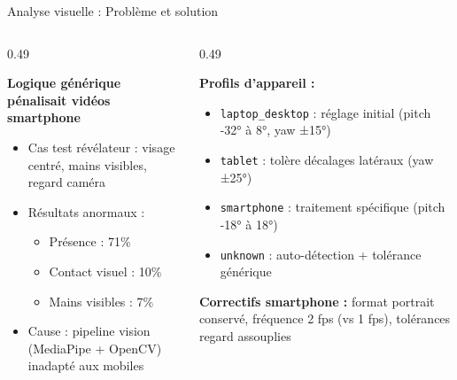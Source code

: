 \documentclass[10pt,aspectratio=169]{beamer}
\begin{document}
\begin{frame}{Analyse visuelle : Problème et solution}
\begin{columns}[T]
\begin{column}{0.49\textwidth}
\begin{tcolorbox}[title=Problème, colframe=danger, colback=danger!3]
\small
\textbf{Logique générique pénalisait vidéos smartphone}
\begin{itemize}
    \item Cas test révélateur : visage centré, mains visibles, regard caméra
    \item Résultats anormaux :
    \begin{itemize}
        \item Présence : 71\%
        \item Contact visuel : 10\%
        \item Mains visibles : 7\%
    \end{itemize}
    \item Cause : pipeline vision (MediaPipe + OpenCV) inadapté aux mobiles
\end{itemize}
\end{tcolorbox}
\end{column}
\begin{column}{0.49\textwidth}
\begin{tcolorbox}[title=Solution, colframe=success, colback=success!3]
\small
\textbf{Profils d'appareil :}
\begin{itemize}
    \item \texttt{laptop\_desktop} : réglage initial (pitch -32° à 8°, yaw ±15°)
    \item \texttt{tablet} : tolère décalages latéraux (yaw ±25°)
    \item \texttt{smartphone} : traitement spécifique (pitch -18° à 18°)
    \item \texttt{unknown} : auto-détection + tolérance générique
\end{itemize}
\textbf{Correctifs smartphone :} format portrait conservé, fréquence 2 fps (vs 1 fps), tolérances regard assouplies
\end{tcolorbox}
\end{column}
\end{columns}
\end{frame}
\end{document}
